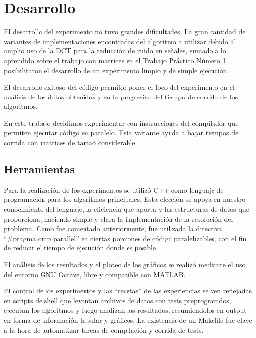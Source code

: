 
\section{Desarrollo}

El desarrollo del experimento no tuvo grandes dificultades. La gran cantidad de
variantes de implementaciones encontradas del algoritmo a utilizar debido al
amplio uso de la DCT para la reducci\'on de ruido en se\~nales, sumado a lo
aprendido sobre el trabajo con matrices en el Trabajo Pr\'actico N\'umero 1
posibilitaron el desarrollo de un experimento limpio y de simple ejecuci\'on.

El desarrollo exitoso del c\'odigo permiti\'o poner el foco del experimento en
el an\'alisis de los datos obtenidos y en la progresiva del tiempo de corrida
de los algoritmos.

En este trabajo decidimos experimentar con instrucciones del compilador que
permiten ejecutar c\'odigo en paralelo. Esta variante ayuda a bajar tiempos de
corrida con matrices de tama\~o considerable.

\subsection{Herramientas}

Para la realizaci\'on de los experimentos se utiliz\'o C++ como lenguaje de
programaci\'on para los algoritmos principales. Esta elecci\'on se apoya en
nuestro conocimiento del lenguaje, la eficiencia que aporta y las estructuras de
datos que proporciona, haciendo simple y clara la implementaci\'on de la
resoluci\'on del problema. Como fue comentado anteriormente, fue utilizada la
directiva ``\#pragma omp parallel'' en ciertas porciones de c\'odigo
paralelizables, con el fin de reducir el tiempo de ejecuci\'on donde es posible.

El an\'alisis de los resultados y el ploteo de los gr\'aficos se realiz\'o
mediante el uso del entorno \href{http://www.gnu.org/software/octave/}{GNU
Octave}, libre y compatible con MATLAB.

El control de los experimentos y las ``recetas'' de las experiencias se ven
reflejadas en scripts de shell que levantan archivos de datos con tests
preprogramdos, ejecutan los algoritmos y luego analizan los resultados,
resumiendolos en output en forma de informaci\'on tabular y gr\'aficos.
La existencia de un Makefile fue clave a la hora de automatizar tareas de
compilaci\'on y corrida de tests.

